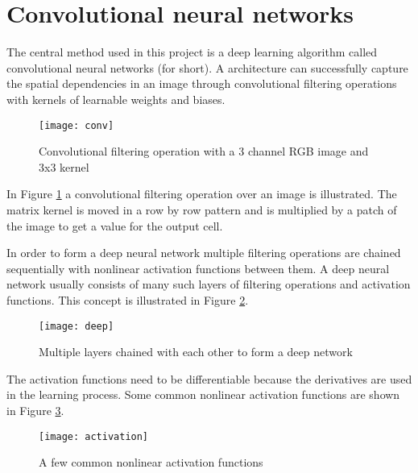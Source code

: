\section{Convolutional neural networks}

The central method used in this project is a deep learning algorithm called convolutional neural networks (\abbrCNN for short). A \abbrCNN architecture can successfully capture the spatial dependencies in an image through convolutional filtering operations with kernels of learnable weights and biases.

\begin{figure}[H]
	\centering
	\texttt{[image: conv]}
	\caption{Convolutional filtering operation with a 3 channel RGB image and 3x3 kernel}
	\label{fig:conv}
\end{figure}

In Figure \ref{fig:conv} a convolutional filtering operation over an image is illustrated. The matrix kernel is moved in a row by row pattern and is multiplied by a patch of the image to get a value for the output cell.

In order to form a deep neural network multiple filtering operations are chained sequentially with nonlinear activation functions between them. A deep neural network usually consists of many such layers of filtering operations and activation functions. This concept is illustrated in Figure \ref{fig:deep}.

\begin{figure}[H]
	\centering
	\texttt{[image: deep]}
	\caption{Multiple layers chained with each other to form a deep network}
	\label{fig:deep}
\end{figure}

The activation functions need to be differentiable because the derivatives are used in the learning process. Some common nonlinear activation functions are shown in Figure \ref{fig:activation}.

\begin{figure}[H]
	\centering
	\texttt{[image: activation]}
	\caption{A few common nonlinear activation functions}
	\label{fig:activation}
\end{figure}

